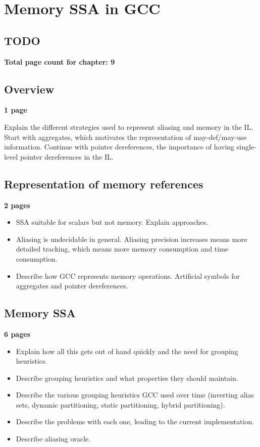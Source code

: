 \applynumberofpages\chapter{Memory SSA in GCC }
\section{TODO}

\textbf{Total page count for chapter: 9}

\section{Overview}

\textbf{1 page}

Explain the different strategies used to represent aliasing and
memory in the IL.  Start with aggregates, which motivates the
representation of may-def/may-use information.  Continue with
pointer dereferences, the importance of having single-level
pointer dereferences in the IL.

\section{Representation of memory references}

\textbf{2 pages}

\begin{itemize}
\item	SSA suitable for scalars but not memory.  Explain
	approaches.

\item	Aliasing is undecidable in general.  Aliasing precision
	increases means more detailed tracking, which means more
	memory consumption and time consumption.

\item	Describe how GCC represents memory operations.
	Artificial symbols for aggregates and pointer
	dereferences.
\end{itemize}

\section{Memory SSA}

\textbf{6 pages}

\begin{itemize}
\item	Explain how all this gets out of hand quickly and the
	need for grouping heuristics.

\item	Describe grouping heuristics and what properties they
	should maintain.

\item	Describe the various grouping heuristics GCC used over
	time (inverting alias sets, dynamic partitioning, static
	partitioning, hybrid partitioning).

\item	Describe the problems with each one, leading to the
	current implementation.

\item	Describe aliasing oracle.
\end{itemize}


